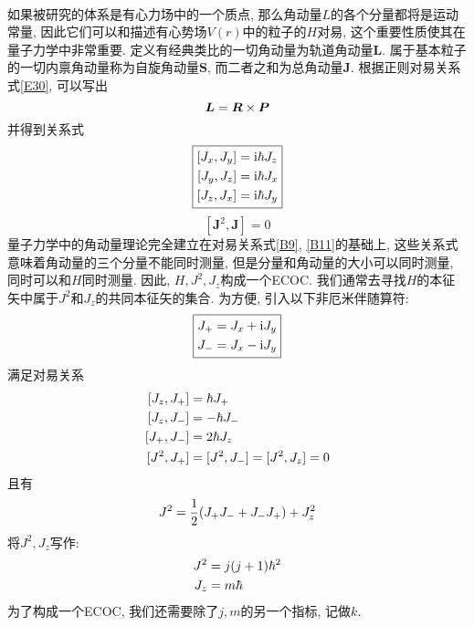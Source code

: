 \documentclass[UTF8]{ctexart}
\numberwithin{equation}{subsection}
\begin{document}

\ 


如果被研究的体系是有心力场中的一个质点, 那么角动量$L$的各个分量都将是运动常量, 因此它们可以和描述有心势场$V(r)$中的粒子的$H$对易, 这个重要性质使其在量子力学中非常重要. 
定义有经典类比的一切角动量为轨道角动量$\bm{L}$. 属于基本粒子的一切内禀角动量称为自旋角动量$\bm{S}$, 而二者之和为总角动量$\bm{J}$.
根据正则对易关系式\ref{E30}, 可以写出
$$\bm{L}=\bm{R}\times\bm{P}$$
并得到关系式
\begin{equation}
    \boxed{\ar{
    [J_x,J_y] \x \i\hbar J_z\\
    [J_y,J_z] \x \i\hbar J_x\\
    [J_z,J_x] \x \i\hbar J_y
}\label{B9}}\end{equation}
\begin{equation}\boxed{
    [\bm{J}^2,\bm{J}]=0 \label{B11}
}
\end{equation}
量子力学中的角动量理论完全建立在对易关系式\ref{B9}, \ref{B11}的基础上, 这些关系式意味着角动量的三个分量不能同时测量, 但是分量和角动量的大小可以同时测量, 同时可以和$H$同时测量. 因此, $H,J^2,J_z$构成一个ECOC. 我们通常去寻找$H$的本征矢中属于$J^2$和$J_z$的共同本征矢的集合.
\sub{定义与符号}
为方便, 引入以下非厄米伴随算符:
$$\boxed{\begin{aligned} 
    J_+ &= J_x+\mathrm{i} J_y\\
    J_- &= J_x-\mathrm{i} J_y
 \end{aligned}}$$
满足对易关系
$$\ar{
    [J_z,J_+] \x \hbar J_+\\
    [J_z,J_-] \x -\hbar J_-\\
    [J_+,J_-] \x 2\hbar J_z\\
    [J^2,J_+] \x [J^2,J_-] = [J^2,J_z] = 0
}$$
且有
$$J^2=\frac{1}{2}(J_+J_-+J_-J_+)+J_z^2$$
将$J^2, J_z$写作:
$$\begin{aligned} 
    J^2 &= j(j+1)\hbar^2\\
    J_z &= m\hbar
 \end{aligned}$$
为了构成一个ECOC, 我们还需要除了$j,m$的另一个指标, 记做$k$.
\end{document}
